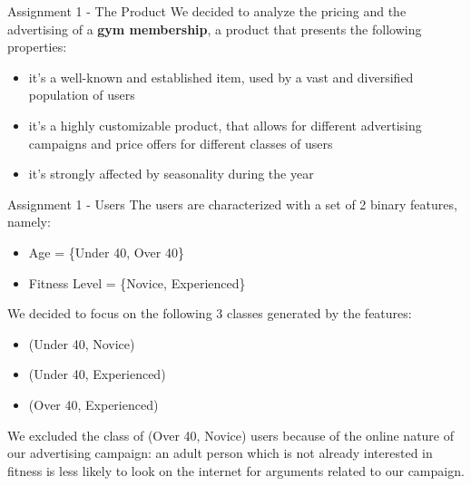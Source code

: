 \documentclass[11pt]{beamer}
\begin{document}

\begin{frame}{Assignment 1 - The Product}
We decided to analyze the pricing and the advertising of a \textbf{gym membership}, a product that presents the following properties:
\begin{itemize}
\item it's a well-known and established item, used by a vast and diversified population of users
\item it's a highly customizable product, that allows for different advertising campaigns and price offers for different classes of users
\item it's strongly affected by seasonality during the year
\end{itemize}
\end{frame}

\begin{frame}{Assignment 1 - Users}
The users are characterized with a set of 2 binary features, namely:
\begin{itemize}
\item Age = \{Under 40, Over 40\}
\item Fitness Level = \{Novice, Experienced\}
\end{itemize}
We decided to focus on the following 3 classes generated by the features:
\begin{itemize}
\item (Under 40, Novice)
\item (Under 40, Experienced)
\item (Over 40, Experienced)
\end{itemize}
We excluded the class of (Over 40, Novice) users because of the online nature of our advertising campaign: an adult person which is not already interested in fitness is less likely to look on the internet for arguments related to our campaign.
\end{frame}
\end{document}
